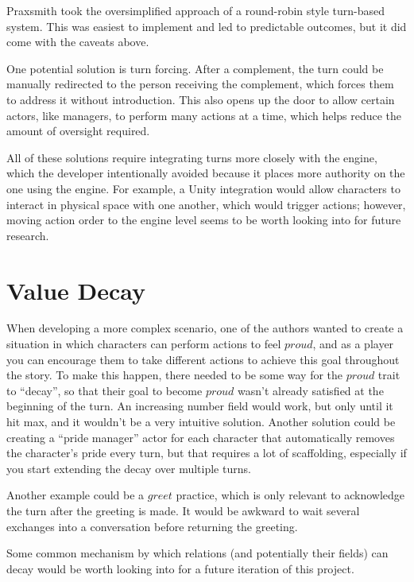 Praxsmith took the oversimplified approach of a round-robin style turn-based system.
This was easiest to implement and led to predictable outcomes, but it did come with
the caveats above.

One potential solution is turn forcing. After a complement, the turn could be manually
redirected to the person receiving the complement, which forces them to address it
without introduction. This also opens up the door to allow certain actors, like managers,
to perform many actions at a time, which helps reduce the amount of oversight required.

All of these solutions require integrating turns more closely with the engine, which
the developer intentionally avoided because it places more authority on the one using
the engine. For example, a Unity integration would allow characters to interact in
physical space with one another, which would trigger actions; however, moving action
order to the engine level seems to be worth looking into for future research.

\section{Value Decay} \label{sec:ValueDecay}

When developing a more complex scenario, one of the authors wanted to create a situation
in which characters can perform actions to feel $proud$, and as a player you can
encourage them to take different actions to achieve this goal throughout the story.
To make this happen, there needed to be some way for the $proud$ trait to ``decay'',
so that their goal to become $proud$ wasn't already satisfied at the beginning of the
turn. An increasing number field would work, but only until it hit max, and it wouldn't
be a very intuitive solution. Another solution could be creating a ``pride manager''
actor for each character that automatically removes the character's pride every turn, but
that requires a lot of scaffolding, especially if you start extending the decay over
multiple turns.

Another example could be a $greet$ practice, which is only relevant to acknowledge
the turn after the greeting is made. It would be awkward to wait several exchanges
into a conversation before returning the greeting.

Some common mechanism by which relations (and potentially their fields) can decay would
be worth looking into for a future iteration of this project.

